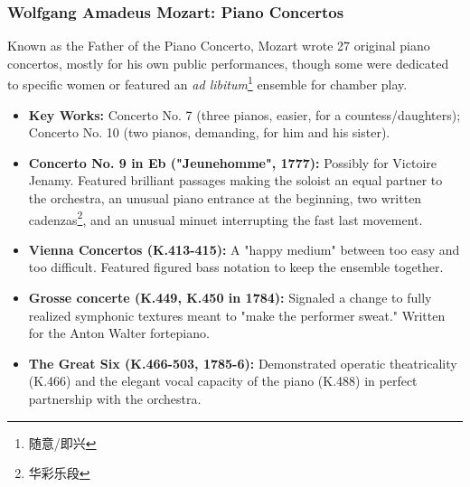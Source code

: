 \documentclass[math,code]{amznotes}
\theoremstyle{remark}
\begin{document}
\subsubsection{Wolfgang Amadeus Mozart: Piano Concertos}
Known as the Father of the Piano Concerto, Mozart wrote 27 original piano concertos, mostly for his own public performances, though some were dedicated to specific women or featured an \textit{ad libitum}\footnote{随意/即兴} ensemble for chamber play.
\begin{itemize}
    \item \textbf{Key Works:} Concerto No. 7 (three pianos, easier, for a countess/daughters); Concerto No. 10 (two pianos, demanding, for him and his sister).
    \item \textbf{Concerto No. 9 in Eb ("Jeunehomme", 1777):} Possibly for Victoire Jenamy. Featured brilliant passages making the soloist an equal partner to the orchestra, an unusual piano entrance at the beginning, two written cadenzas\footnote{华彩乐段}, and an unusual minuet interrupting the fast last movement.
    \item \textbf{Vienna Concertos (K.413-415):} A "happy medium" between too easy and too difficult. Featured figured bass notation to keep the ensemble together.
    \item \textbf{Grosse concerte (K.449, K.450 in 1784):} Signaled a change to fully realized symphonic textures meant to "make the performer sweat." Written for the Anton Walter fortepiano.
    \item \textbf{The Great Six (K.466-503, 1785-6):} Demonstrated operatic theatricality (K.466) and the elegant vocal capacity of the piano (K.488) in perfect partnership with the orchestra.
\end{itemize}
\end{document}
